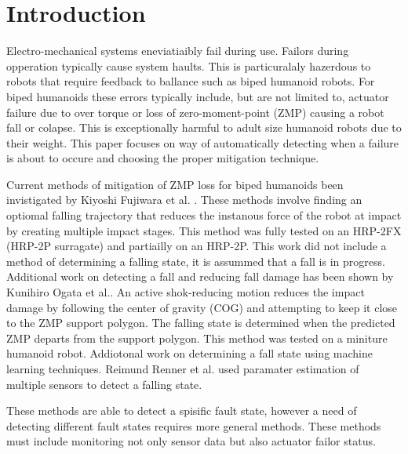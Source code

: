 \section{Introduction}
Electro-mechanical systems eneviatiaibly fail during use.  Failors during opperation typically cause system haults.  This is particuralaly hazerdous to robots that require feedback to ballance such as biped humanoid robots.  For biped humanoids these errors typically include, but are not limited to, actuator failure due to over torque or loss of zero-moment-point (ZMP) \cite{zmp35} causing a robot fall or colapse.  This is exceptionally harmful to adult size humanoid robots due to their weight.  This paper focuses on way of automatically detecting when a failure is about to occure and choosing the proper mitigation technique. 

Current methods of mitigation of ZMP loss for biped humanoids been invistigated by Kiyoshi Fujiwara et al. \cite{4115653}.  These methods involve finding an optiomal falling trajectory that reduces the instanous force of the robot at impact by creating multiple impact stages\cite{4399327}.  This method was fully tested on an HRP-2FX (HRP-2P surragate) and partiailly on an HRP-2P.  This work did not include a method of determining a falling state, it is assummed that a fall is in progress.  Additional work on detecting a fall and reducing fall damage has been shown by Kunihiro Ogata et al.\cite{4755950}.  An active shok-reducing motion reduces the impact damage by following the center of gravity (COG) and attempting to keep it close to the ZMP support polygon.  The falling state is determined when the predicted ZMP departs from the support polygon. This method was tested on a miniture humanoid robot.  Addiotonal work on determining a fall state using machine learning techniques\cite{4813885}.  Reimund Renner et al. used paramater estimation of multiple sensors to detect a falling state\cite{4058847}.

These methods are able to detect a spisific fault state, however a need of detecting different fault states requires more general methods.  These methods must include monitoring not only sensor data but also actuator failor status.  